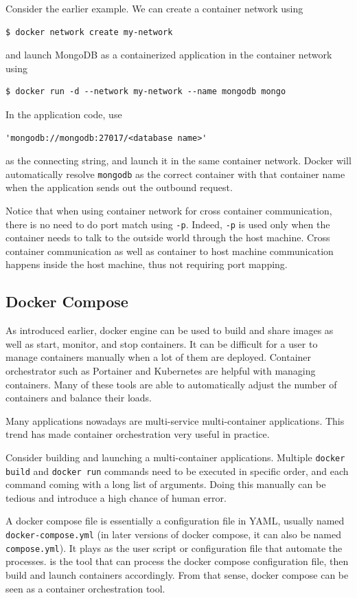 Consider the earlier example. We can create a container network using
\begin{lstlisting}
$ docker network create my-network
\end{lstlisting}
and launch MongoDB as a containerized application in the container network using
\begin{lstlisting}
$ docker run -d --network my-network --name mongodb mongo
\end{lstlisting}
In the application code, use
\begin{lstlisting}
'mongodb://mongodb:27017/<database name>'	
\end{lstlisting}
as the connecting string, and launch it in the same container network. Docker will automatically resolve \verb|mongodb| as the correct container with that container name when the application sends out the outbound request.

Notice that when using container network for cross container communication, there is no need to do port match using \verb|-p|. Indeed, \verb|-p| is used only when the container needs to talk to the outside world through the host machine. Cross container communication as well as container to host machine communication happens inside the host machine, thus not requiring port mapping.

\subsection{Docker Compose}

As introduced earlier, docker engine can be used to build and share images as well as start, monitor, and stop containers. It can be difficult for a user to manage containers manually when a lot of them are deployed. Container orchestrator such as Portainer and Kubernetes are helpful with managing containers. Many of these tools are able to automatically adjust the number of containers and balance their loads.

Many applications nowadays are multi-service multi-container applications. This trend has made container orchestration very useful in practice.

Consider building and launching a multi-container applications. Multiple \verb|docker build| and \verb|docker run| commands need to be executed in specific order, and each command coming with a long list of arguments. Doing this manually can be tedious and introduce a high chance of human error.

A docker compose file is essentially a configuration file in YAML, usually named \verb|docker-compose.yml| (in later versions of docker compose, it can also be named \verb|compose.yml|). It plays as the user script or configuration file that automate the processes.  is the tool that can process the docker compose configuration file, then build and launch containers accordingly. From that sense, docker compose can be seen as a container orchestration tool. 

